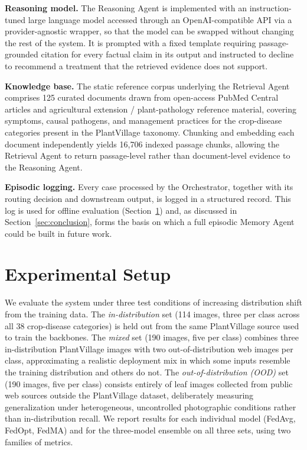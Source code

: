 \documentclass[conference]{IEEEtran}
\begin{document}
\textbf{Reasoning model.} The Reasoning Agent is implemented with an instruction-tuned large language model accessed through an OpenAI-compatible API via a provider-agnostic wrapper, so that the model can be swapped without changing the rest of the system. It is prompted with a fixed template requiring passage-grounded citation for every factual claim in its output and instructed to decline to recommend a treatment that the retrieved evidence does not support.

\textbf{Knowledge base.} The static reference corpus underlying the Retrieval Agent comprises 125 curated documents drawn from open-access PubMed Central articles and agricultural extension / plant-pathology reference material, covering symptoms, causal pathogens, and management practices for the crop-disease categories present in the PlantVillage taxonomy. Chunking and embedding each document independently yields 16{,}706 indexed passage chunks, allowing the Retrieval Agent to return passage-level rather than document-level evidence to the Reasoning Agent.

\textbf{Episodic logging.} Every case processed by the Orchestrator, together with its routing decision and downstream output, is logged in a structured record. This log is used for offline evaluation (Section~\ref{sec:exp}) and, as discussed in Section~\ref{sec:conclusion}, forms the basis on which a full episodic Memory Agent could be built in future work.

\section{Experimental Setup}
\label{sec:exp}

We evaluate the system under three test conditions of increasing distribution shift from the training data. The \emph{in-distribution} set (114 images, three per class across all 38 crop-disease categories) is held out from the same PlantVillage source used to train the backbones. The \emph{mixed} set (190 images, five per class) combines three in-distribution PlantVillage images with two out-of-distribution web images per class, approximating a realistic deployment mix in which some inputs resemble the training distribution and others do not. The \emph{out-of-distribution (OOD)} set (190 images, five per class) consists entirely of leaf images collected from public web sources outside the PlantVillage dataset, deliberately measuring generalization under heterogeneous, uncontrolled photographic conditions rather than in-distribution recall. We report results for each individual model (FedAvg, FedOpt, FedMA) and for the three-model ensemble on all three sets, using two families of metrics.
\end{document}
